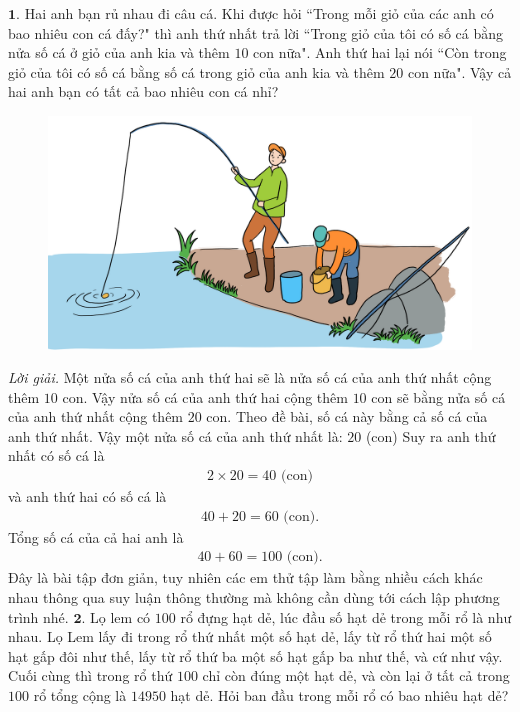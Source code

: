 \begin{multicols}{2}
	$\pmb{1.}$ Hai anh bạn rủ nhau đi câu cá. Khi được hỏi ``Trong mỗi giỏ của các anh có bao nhiêu con cá đấy?" thì anh thứ nhất trả lời ``Trong giỏ của tôi có số cá bằng nửa số cá ở giỏ của anh kia và thêm $10$ con nữa". Anh thứ hai lại nói ``Còn trong giỏ của tôi có số cá bằng số cá trong giỏ của anh kia và thêm $20$ con nữa". Vậy cả hai anh bạn có tất cả bao nhiêu con cá nhỉ? 
	\begin{figure}[H]
		\centering
		\vspace*{-10pt}
		\captionsetup{labelformat= empty, justification=centering}
		\includegraphics[width=1\linewidth]{Pi10_ToanBi_Bai1}
		\vspace*{-15pt}
	\end{figure}
	\textit{Lời giải.} Một nửa số cá của anh thứ hai sẽ là nửa số cá của anh thứ nhất cộng thêm $10$ con. Vậy nửa số cá của anh thứ hai cộng thêm $10$ con sẽ bằng nửa số cá của anh thứ nhất cộng thêm $20$ con. Theo đề bài, số cá này bằng cả số cá của anh thứ nhất.
	\vskip 0.1cm
	Vậy một nửa số cá của anh thứ nhất là: $20$ (con)
	\vskip 0.1cm
	Suy ra anh thứ nhất có số cá là
	\begin{align*}
		2 \times 20 = 40 \text{  (con)}
	\end{align*}
	và anh thứ hai có số cá là 
	\begin{align*}
		40+20 = 60 \text{  (con).}
	\end{align*} 
	Tổng số cá của cả hai anh là 
	\begin{align*}
		40+60 = 100 \text{  (con).}
	\end{align*}
	Đây là bài tập đơn giản, tuy nhiên các em thử tập làm bằng nhiều cách khác nhau thông qua suy luận thông thường mà không cần dùng tới cách lập phương trình nhé.
	\vskip 0.1cm
	$\pmb{2.}$ Lọ lem có $100$ rổ đựng hạt dẻ, lúc đầu số hạt dẻ trong mỗi rổ là như nhau. Lọ Lem lấy đi trong rổ thứ nhất một số hạt dẻ, lấy từ rổ  thứ hai một số hạt gấp đôi như thế, lấy từ rổ thứ ba một số hạt gấp ba như thế, và cứ như vậy. Cuối cùng thì trong rổ thứ $100$ chỉ còn đúng một hạt dẻ, và còn lại ở tất cả trong $100$ rổ tổng cộng là $14950$ hạt dẻ. Hỏi ban đầu trong mỗi rổ có bao nhiêu hạt dẻ?

\end{multicols}
